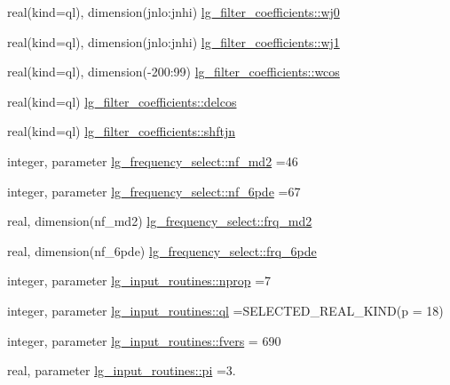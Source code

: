 \begin{DoxyCompactItemize}
\item 
real(kind=ql), dimension(jnlo\+:jnhi) \hyperlink{namespacelg__filter__coefficients_a6118aefd8a6bfd0fedbf5530507da50f}{lg\+\_\+filter\+\_\+coefficients\+::wj0}
\item 
real(kind=ql), dimension(jnlo\+:jnhi) \hyperlink{namespacelg__filter__coefficients_afbcfe820a24e8a0419832a766757189c}{lg\+\_\+filter\+\_\+coefficients\+::wj1}
\item 
real(kind=ql), dimension(-\/200\+:99) \hyperlink{namespacelg__filter__coefficients_aefdd258fb993cc8ed0f37278866238ee}{lg\+\_\+filter\+\_\+coefficients\+::wcos}
\item 
real(kind=ql) \hyperlink{namespacelg__filter__coefficients_a0d1c6540b355a11602f9dd08b362250f}{lg\+\_\+filter\+\_\+coefficients\+::delcos}
\item 
real(kind=ql) \hyperlink{namespacelg__filter__coefficients_a70196dc988ca498d279e9e2696d5862e}{lg\+\_\+filter\+\_\+coefficients\+::shftjn}
\item 
integer, parameter \hyperlink{namespacelg__frequency__select_ae72bcd5e146b6a04a0710200a495ff37}{lg\+\_\+frequency\+\_\+select\+::nf\+\_\+md2} =46
\item 
integer, parameter \hyperlink{namespacelg__frequency__select_a818527c2ee0dfa5437912455428b1e26}{lg\+\_\+frequency\+\_\+select\+::nf\+\_\+6pde} =67
\item 
real, dimension(nf\+\_\+md2) \hyperlink{namespacelg__frequency__select_aecc56fd88fc350f0a438427a684bc458}{lg\+\_\+frequency\+\_\+select\+::frq\+\_\+md2}
\item 
real, dimension(nf\+\_\+6pde) \hyperlink{namespacelg__frequency__select_a763dede7194d9d24009ee6fe23532178}{lg\+\_\+frequency\+\_\+select\+::frq\+\_\+6pde}
\item 
integer, parameter \hyperlink{namespacelg__input__routines_a359e88d4557350cba3a221e513b5a0fa}{lg\+\_\+input\+\_\+routines\+::nprop} =7
\item 
integer, parameter \hyperlink{namespacelg__input__routines_a8c3fd17aa03dd450ed3e242df939ad01}{lg\+\_\+input\+\_\+routines\+::ql} =S\+E\+L\+E\+C\+T\+E\+D\+\_\+\+R\+E\+A\+L\+\_\+\+K\+I\+ND(p = 18)
\item 
integer, parameter \hyperlink{namespacelg__input__routines_ad64edbbe93c0335e2a4d4d767eb9bbd1}{lg\+\_\+input\+\_\+routines\+::fvers} = 690
\item 
real, parameter \hyperlink{namespacelg__input__routines_a7464991af66db8354411ef5f57a78a71}{lg\+\_\+input\+\_\+routines\+::pi} =3.
\item 

\end{DoxyCompactItemize}
